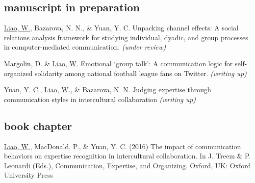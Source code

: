 \documentclass[11pt, letterpaper]{article} %
\newcommand{\years}[1]{\leavevmode\marginnote{\scriptsize #1}} %
\begin{document}

\subsection*{manuscript in preparation}

\begin{hangparas}{.25in}{1}
\underline{Liao, W.}, Bazarova, N. N., \& Yuan, Y. C. Unpacking channel effects: A social relations analysis framework for studying individual, dyadic, and group processes in computer-mediated communication. \textsl{(under review)}

Margolin, D. \& \underline{Liao, W.} Emotional ‘group talk’: A communication logic for self-organized solidarity among national football league fans on Twitter. \textsl{(writing up)}

Yuan, Y. C., \underline{Liao, W.}, \& Bazarova, N. N. Judging expertise through communication styles in intercultural collaboration \textsl{(writing up)}

\end{hangparas}


\subsection*{book chapter}
\begin{hangparas}{.25in}{1}

    \underline{Liao, W.}, \years{2016}  MacDonald, P., \& Yuan, Y. C. (2016) The impact of communication behaviors on expertise recognition in intercultural collaboration. In J. Treem \& P. Leonardi (Eds.), Communication, Expertise, and Organizing. Oxford, UK: Oxford University Press
\end{hangparas}

\end{document}
